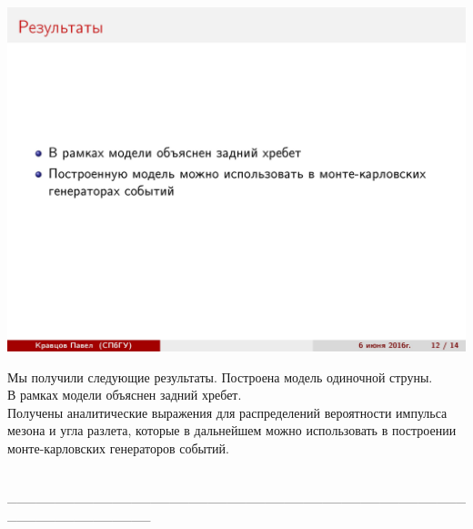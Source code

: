 \documentclass[14pt]{article}
\renewcommand{\line}{\\ \_\_\_\_\_\_\_\_\_\_\_\_\_\_\_\_\_\_\_\_\_\_\_\_\_\_\_\_\_\_\_\_\_\_\_\_\_\_\_\_\_\_\_\_\_\_\_\_\_\_\_\_\_\_\_\_\_\_\_\_\_\_\_ \\ }
\begin{document}
\begin{minipage}[h]{0.5\linewidth}
\includegraphics[width=1\linewidth]{page-12.jpg}
\end{minipage}
\begin{minipage}[h]{0.45\linewidth}
Мы получили следующие результаты.
Построена модель одиночной струны. \\
В рамках модели объяснен задний хребет. \\
Получены аналитические выражения для распределений вероятности импульса мезона и угла разлета, которые в дальнейшем можно использовать в построении монте-карловских генераторов событий.
\end{minipage}
\line
\end{document}
